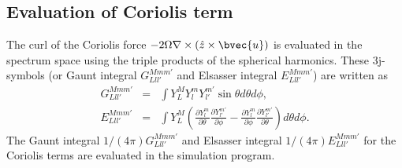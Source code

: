 \subsection{Evaluation of Coriolis term}
The curl of the Coriolis force $-2\Omega \nabla \times \left(\hat{z} \times \bvec{u} \right)$ is evaluated in the spectrum space using the triple products of the spherical harmonics. These 3j-symbols (or Gaunt integral $G_{Lll'}^{Mmm'}$ and Elsasser integral $E_{Lll'}^{Mmm'}$) are written as
%
\begin{eqnarray}
G_{Lll'}^{Mmm'} & = & \int Y_{L}^{M} Y_{l}^{m} Y_{l'}^{m'}
\sin\theta d\theta d\phi,
\label{eq:gaunt} \\
%
E_{Lll'}^{Mmm'} & = & \int Y_{L}^{M} \left (
   \frac{\partial Y_{l}^{m}}{\partial \theta} \frac{\partial Y_{l'}^{m'}}{\partial\phi}
 - \frac{\partial Y_{l}^{m}}{\partial \phi} \frac{\partial Y_{l'}^{m'}}{\partial \theta}
\right) d\theta d\phi.
\label{eq:elsasser}
\end{eqnarray}
%
The Gaunt integral $1/(4\pi) G_{Lll'}^{Mmm'}$ and Elsasser integral $1/(4\pi) E_{Lll'}^{Mmm'}$ for the Coriolis terms are evaluated in the simulation program.

